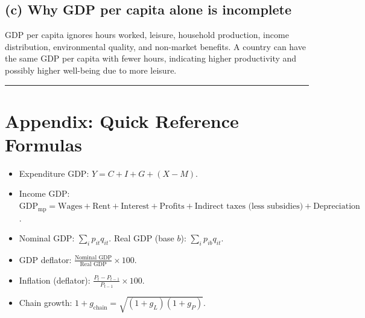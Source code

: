 \documentclass[11pt]{article}
\begin{document}
\subsection*{(c) Why GDP per capita alone is incomplete}
GDP per capita ignores hours worked, leisure, household production, income distribution, environmental quality, and non-market benefits. A country can have the same GDP per capita with fewer hours, indicating higher productivity and possibly higher well-being due to more leisure.

\bigskip
\hrule
\bigskip

\section*{Appendix: Quick Reference Formulas}
\begin{itemize}[leftmargin=*]
  \item Expenditure GDP: \(Y=C+I+G+(X-M)\).
  \item Income GDP: \(\text{GDP}_{\text{mp}}=\text{Wages}+\text{Rent}+\text{Interest}+\text{Profits}+\text{Indirect taxes (less subsidies)}+\text{Depreciation}\).
  \item Nominal GDP: \(\sum_i p_{it}q_{it}\). Real GDP (base \(b\)): \(\sum_i p_{ib}q_{it}\).
  \item GDP deflator: \(\displaystyle \frac{\text{Nominal GDP}}{\text{Real GDP}}\times 100\).
  \item Inflation (deflator): \(\displaystyle \frac{P_t-P_{t-1}}{P_{t-1}}\times 100\).
  \item Chain growth: \(1+g_{\text{chain}}=\sqrt{(1+g_L)(1+g_P)}\).
\end{itemize}
\end{document}
